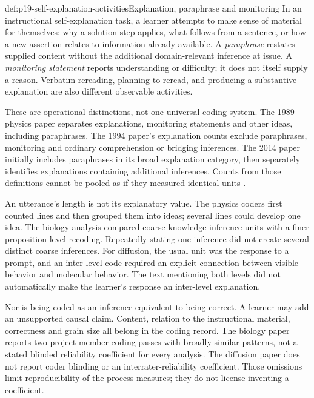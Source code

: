\begin{hbdefinition}{def:p19-self-explanation-activities}{Explanation, paraphrase and monitoring}
In an instructional self-explanation task, a learner attempts to make sense
of material for themselves: why a solution step applies, what follows from
a sentence, or how a new assertion relates to information already available.
A \emph{paraphrase} restates supplied content without the additional
domain-relevant inference at issue. A \emph{monitoring statement} reports
understanding or difficulty; it does not itself supply a reason. Verbatim
rereading, planning to reread, and producing a substantive explanation are
also different observable activities.

These are operational distinctions, not one universal coding system.
The 1989 physics paper separates explanations, monitoring statements and
other ideas, including paraphrases. The 1994 paper's explanation counts
exclude paraphrases, monitoring and ordinary comprehension or bridging
inferences. The 2014 paper initially includes paraphrases in its broad
explanation category, then separately identifies explanations containing
additional inferences. Counts from those definitions cannot be pooled
as if they measured identical units
\cite[pp.~158--164]{ChiEtAl1989SelfExplanations}
\cite[pp.~454--457]{ChiEtAl1994Eliciting}
\cite[pp.~850--852]{MuldnerBurlesonChi2014Emergent}.
\end{hbdefinition}

An utterance's length is not its explanatory value. The physics coders
first counted lines and then grouped them into ideas; several lines could
develop one idea. The biology analysis compared coarse knowledge-inference
units with a finer proposition-level recoding. Repeatedly stating one
inference did not create several distinct coarse inferences. For diffusion,
the usual unit was the response to a prompt, and an inter-level code required
an explicit connection between visible behavior and molecular behavior.
The text mentioning both levels did not automatically make the learner's
response an inter-level explanation.

Nor is being coded as an inference equivalent to being correct. A learner
may add an unsupported causal claim. Content, relation to the instructional
material, correctness and grain size all belong in the coding record.
The biology paper reports two project-member coding passes with broadly
similar patterns, not a stated blinded reliability coefficient for every
analysis. The diffusion paper does not report coder blinding or an
interrater-reliability coefficient. Those omissions limit reproducibility
of the process measures; they do not license inventing a coefficient.

